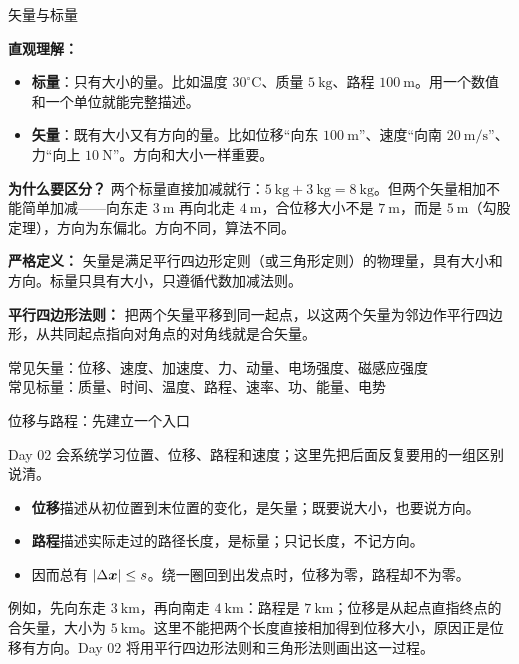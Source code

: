 \begin{conceptbox}{矢量与标量}

\textbf{直观理解：}
\begin{itemize}
  \item \textbf{标量}：只有大小的量。比如温度 $30^\circ\mathrm{C}$、质量 $5\ \mathrm{kg}$、路程 $100\ \mathrm{m}$。用一个数值和一个单位就能完整描述。
  \item \textbf{矢量}：既有大小又有方向的量。比如位移“向东 $100\ \mathrm{m}$”、速度“向南 $20\ \mathrm{m/s}$”、力“向上 $10\ \mathrm{N}$”。方向和大小一样重要。
\end{itemize}

\textbf{为什么要区分？} 两个标量直接加减就行：$5\ \mathrm{kg} + 3\ \mathrm{kg} = 8\ \mathrm{kg}$。但两个矢量相加不能简单加减——向东走 $3\ \mathrm{m}$ 再向北走 $4\ \mathrm{m}$，合位移大小不是 $7\ \mathrm{m}$，而是 $5\ \mathrm{m}$（勾股定理），方向为东偏北。方向不同，算法不同。

\textbf{严格定义：} 矢量是满足平行四边形定则（或三角形定则）的物理量，具有大小和方向。标量只具有大小，只遵循代数加减法则。

\textbf{平行四边形法则：} 把两个矢量平移到同一起点，以这两个矢量为邻边作平行四边形，从共同起点指向对角点的对角线就是合矢量。

\begin{center}


\label{fig:vector-addition}
\end{center}

\vspace{0.3em}
常见矢量：位移、速度、加速度、力、动量、电场强度、磁感应强度\\
常见标量：质量、时间、温度、路程、速率、功、能量、电势

\end{conceptbox}

\begin{conceptbox}{位移与路程：先建立一个入口}

Day 02 会系统学习位置、位移、路程和速度；这里先把后面反复要用的一组区别说清。

\begin{itemize}
  \item \textbf{位移}描述从初位置到末位置的变化，是矢量；既要说大小，也要说方向。
  \item \textbf{路程}描述实际走过的路径长度，是标量；只记长度，不记方向。
  \item 因而总有 $|\Delta\boldsymbol{x}|\leq s$。绕一圈回到出发点时，位移为零，路程却不为零。
\end{itemize}

例如，先向东走 $3\ \mathrm{km}$，再向南走 $4\ \mathrm{km}$：路程是 $7\ \mathrm{km}$；位移是从起点直指终点的合矢量，大小为 $5\ \mathrm{km}$。这里不能把两个长度直接相加得到位移大小，原因正是位移有方向。Day 02 将用平行四边形法则和三角形法则画出这一过程。

\end{conceptbox}

